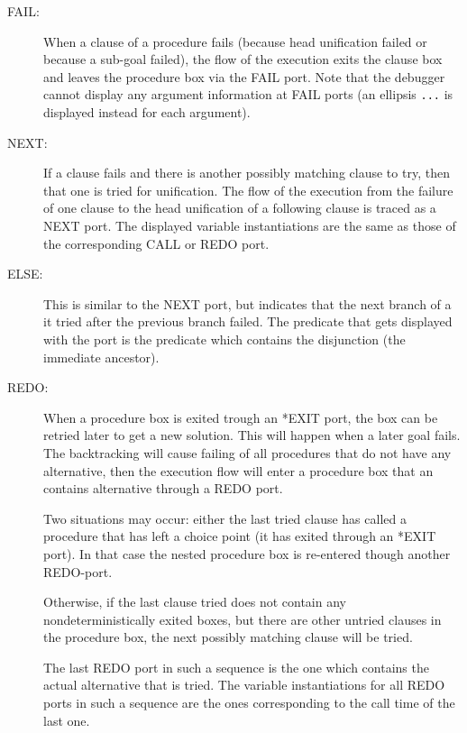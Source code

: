 \begin{description}
\item[FAIL:] When a clause of a procedure fails (because head unification
failed or because a sub-goal failed), the flow of the execution exits
the clause box and leaves the procedure box via the FAIL port.
Note that the debugger cannot display any argument information at
FAIL ports (an ellipsis \verb:...: is displayed instead for each argument).

\item[NEXT:] If a clause fails and there is another possibly
matching clause to try, then that one is tried for unification.
The flow of the execution from the failure of one clause to the
head unification of a following clause is traced as a NEXT port.
The displayed variable instantiations are the same as those of the
corresponding CALL or REDO port.

\item[ELSE:]
This is similar to the NEXT port, but indicates that the next branch of a
it tried after the previous branch failed.
The predicate that gets displayed with the port is the predicate
which contains the disjunction (the immediate ancestor).

\item[REDO:] When a procedure box is exited trough an *EXIT port,
the box can be retried later to get a new solution. This will happen when a
later goal fails. The backtracking will cause failing of all
procedures that do not have any alternative, then the execution flow
will enter a
procedure box that an contains alternative through a REDO port.

Two situations may occur: either the last tried clause has called a
procedure that has left a choice point (it has exited through an
*EXIT port). In that case the nested procedure box is re-entered
though another REDO-port.

Otherwise, if the last clause tried does not contain any
nondeterministically exited boxes, but there are other untried clauses
in the procedure box, the next possibly matching clause will be tried.

The last REDO port in such a sequence is the one which contains the
actual alternative that is tried. The variable instantiations for all
REDO ports in such a sequence are the ones corresponding to the call
time of the last one.

%


\end{description}
